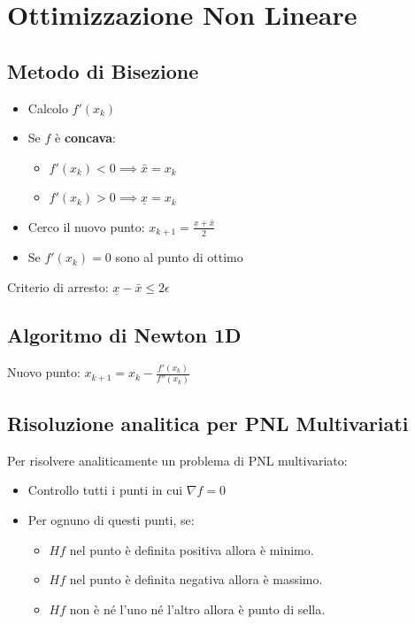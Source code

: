 \documentclass[12pt, a4paper, openany]{book}
\begin{document}
\chapter{Ottimizzazione Non Lineare}

\section{Metodo di Bisezione}

\begin{itemize}
	\item Calcolo $f'(x_k)$
	\item Se $f$ è \textbf{concava}:
	\begin{itemize}
		\item $f'(x_k) < 0 \implies \bar{x} = x_k$
		\item $f'(x_k) > 0 \implies \underline{x} = x_k$
	\end{itemize}
	\item Cerco il nuovo punto: $x_{k+1} = \frac{\underline{x} + \bar{x}}{2}$
	\item Se $f'(x_k) = 0$ sono al punto di ottimo
\end{itemize}
Criterio di arresto: $\underline{x} - \bar{x} \leq 2\epsilon$

\section{Algoritmo di Newton 1D}
Nuovo punto: $x_{k+1}=x_k- \frac{f'(x_k)}{f''(x_k)}$

\section{Risoluzione analitica per PNL Multivariati}
Per risolvere analiticamente un problema di PNL multivariato:
\begin{itemize}
	\item Controllo tutti i punti in cui $\nabla f = 0$
	\item Per ognuno di questi punti, se:
	\begin{itemize}
		\item $Hf$ nel punto è definita positiva allora è minimo.
		\item $Hf$ nel punto è definita negativa allora è massimo.
		\item $Hf$ non è né l'uno né l'altro allora è punto di sella.
	\end{itemize}
\end{itemize}
\end{document}
